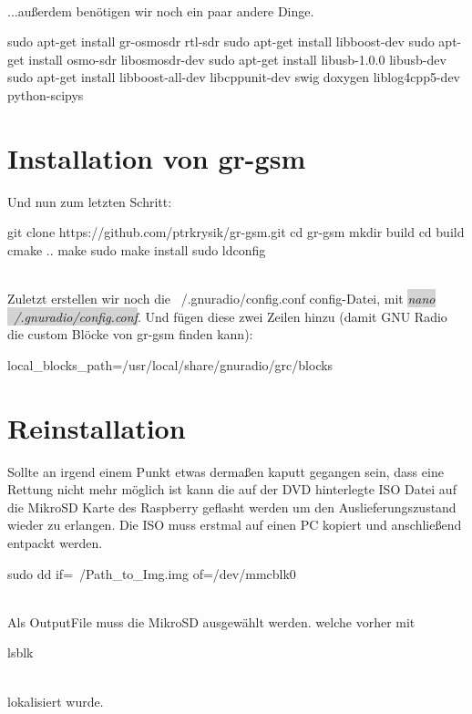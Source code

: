 \noindent\\...außerdem benötigen wir noch ein paar andere Dinge.

\begin{code}[numbers=left, stepnumber=1]
sudo apt-get install gr-osmosdr rtl-sdr
sudo apt-get install libboost-dev
sudo apt-get install osmo-sdr libosmosdr-dev
sudo apt-get install libusb-1.0.0 libusb-dev
sudo apt-get install libboost-all-dev libcppunit-dev swig doxygen liblog4cpp5-dev python-scipys
\end{code}

\section{Installation von gr-gsm}

Und nun zum letzten Schritt:

\begin{code}[numbers=left, stepnumber=1]
git clone https://github.com/ptrkrysik/gr-gsm.git
cd gr-gsm
mkdir build
cd build
cmake ..
make
sudo make install
sudo ldconfig
\end{code}

\noindent\\Zuletzt erstellen wir noch die ~/.gnuradio/config.conf config-Datei, mit \colorbox{lightgray}{\emph{nano ~/.gnuradio/config.conf}}. Und fügen diese zwei Zeilen hinzu (damit GNU Radio die custom Blöcke von gr-gsm finden kann):

\begin{code}
[grc]
local_blocks_path=/usr/local/share/gnuradio/grc/blocks
\end{code}

\section{Reinstallation}
Sollte an irgend einem Punkt etwas dermaßen kaputt gegangen sein, dass eine Rettung nicht mehr möglich ist kann die auf der DVD hinterlegte ISO Datei auf die MikroSD Karte des Raspberry geflasht werden um den Auslieferungszustand wieder zu erlangen. Die ISO muss erstmal auf einen PC kopiert und anschließend entpackt werden.
\begin{code}
sudo dd if=~/Path_to_Img.img of=/dev/mmcblk0 
\end{code}
\noindent\\Als OutputFile muss die MikroSD ausgewählt werden. welche vorher mit 
\begin{code}
lsblk
\end{code}
\noindent\\lokalisiert wurde.